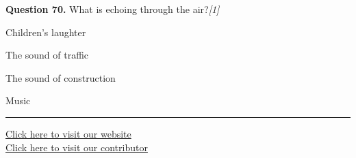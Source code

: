 \documentclass[11pt,a4paper]{article}
\newcommand{\pts}[1]{\hfill   \textit{[#1]}}
\begin{document}
\medskip




\noindent   \textbf{Question 70.} What is echoing through the air?\pts{1}

\begin{parts}
  \item Children's laughter
  \item The sound of traffic
  \item The sound of construction
  \item Music
\end{parts}

\vfill
\rule{\linewidth}{0.4pt}

\begin{center}\small
\href{https://bhu-exam.vercel.app/}{Click here to visit our website}\\[4pt]
\href{https://me-aryan.vercel.app/}{Click here to visit our contributor}
\end{center}
\end{document}
